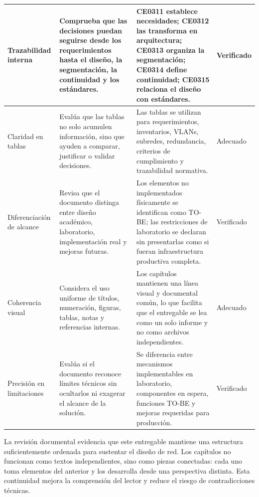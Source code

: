 \documentclass[11pt, a4paper, oneside]{report}
\begin{document}
\begin{xltabular}{\textwidth}{@{}|L{3.2cm}|X|X|L{2.2cm}|@{}}
{\small Trazabilidad interna} &
{\small Comprueba que las decisiones puedan seguirse desde los requerimientos hasta el diseño, la segmentación, la continuidad y los estándares.} &
{\small CE0311 establece necesidades; CE0312 las transforma en arquitectura; CE0313 organiza la segmentación; CE0314 define continuidad; CE0315 relaciona el diseño con estándares.} &
{\small Verificado} \\ \hline

{\small Claridad en tablas} &
{\small Evalúa que las tablas no solo acumulen información, sino que ayuden a comparar, justificar o validar decisiones.} &
{\small Las tablas se utilizan para requerimientos, inventarios, VLANs, subredes, redundancia, criterios de cumplimiento y trazabilidad normativa.} &
{\small Adecuado} \\ \hline

{\small Diferenciación de alcance} &
{\small Revisa que el documento distinga entre diseño académico, laboratorio, implementación real y mejoras futuras.} &
{\small Los elementos no implementados físicamente se identifican como TO-BE; las restricciones de laboratorio se declaran sin presentarlas como si fueran infraestructura productiva completa.} &
{\small Verificado} \\ \hline

{\small Coherencia visual} &
{\small Considera el uso uniforme de títulos, numeración, figuras, tablas, notas y referencias internas.} &
{\small Los capítulos mantienen una línea visual y documental común, lo que facilita que el entregable se lea como un solo informe y no como archivos independientes.} &
{\small Adecuado} \\ \hline

{\small Precisión en limitaciones} &
{\small Evalúa si el documento reconoce límites técnicos sin ocultarlos ni exagerar el alcance de la solución.} &
{\small Se diferencia entre mecanismos implementables en laboratorio, componentes en espera, funciones TO-BE y mejoras requeridas para producción.} &
{\small Verificado} \\ \hline

\end{xltabular}

\normalsize

La revisión documental evidencia que este entregable mantiene una estructura suficientemente ordenada para sustentar el diseño de red. Los capítulos no funcionan como textos independientes, sino como piezas conectadas: cada uno toma elementos del anterior y los desarrolla desde una perspectiva distinta. Esta continuidad mejora la comprensión del lector y reduce el riesgo de contradicciones técnicas.
\end{document}
